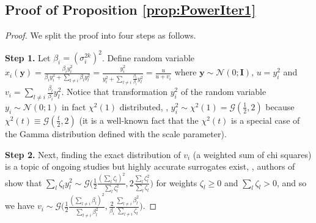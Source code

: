 



\subsection{Proof of Proposition \ref{prop:PowerIter1}}
\label{exp_val}
\begin{proof}[Proof]
We split the proof into four steps as follows.


\vspace{0.1cm}\noindent
\textbf{Step 1.} 
Let $\beta_i=(\sigma_i^{2k})^2$.  Define random variable $x_i(\mathbf{y})=\frac{\beta_i y_{i}^2}{\beta_i y_{i}^2 +\sum_{l\neq i}\beta_l y^2_{l} }=\frac{y_{i}^2}{y_{i}^2 +\sum_{l\neq i}\frac{\beta_l}{\beta_i}y^2_{l} }=\frac{u}{u+v_i}$ where ${\mathbf{y}\sim\mathcal{N}(0;\mathbf{I})}$, $u=y_i^2$ and $v_i=\sum_{l\neq i}\frac{\beta_l}{\beta_i}y^2_{l}$. Notice that transformation $y_i^2$ of the random variable ${{y_i}\sim\mathcal{N}(0;1)}$ in fact $\chi^2(1)$ distributed, \ie, $y_i^2\sim\chi^2(1)=\mathcal{G}(\frac{1}{2},2)$ because $\chi^2(t)\equiv\mathcal{G}(\frac{t}{2},2)$ (it is a well-known fact that the $\chi^2(t)$ is a special case of the Gamma distribution defined with the scale parameter).

\vspace{0.1cm}\noindent
\textbf{Step 2.} 
Next, finding the exact distribution of $v_i$ (a weighted sum of chi squares) is a topic of ongoing studies but highly accurate surrogates exist, \ie, authors of  show that   $\sum_l\zeta_l y_l^2\sim\mathcal{G}\Big(\frac{1}{2}\frac{(\sum_l\zeta_l)^2}{\sum_l\zeta_l^2}, 2\frac{\sum_l\zeta_l^2}{\sum_l \zeta_l} \Big)$ for weights $\zeta_l\geq 0$ and $\sum_l \zeta_l>0$, and so we have 
$v_i\sim\mathcal{G}\Big(\frac{1}{2}\frac{(\sum_{l\neq i}\beta_l)^2}{\sum_{l\neq i}\beta_l^2}, \frac{2}{\beta_i}\frac{\sum_{l\neq i}\beta_l^2}{\sum_{l\neq i} \zeta_l} \Big)$.


\end{proof}
